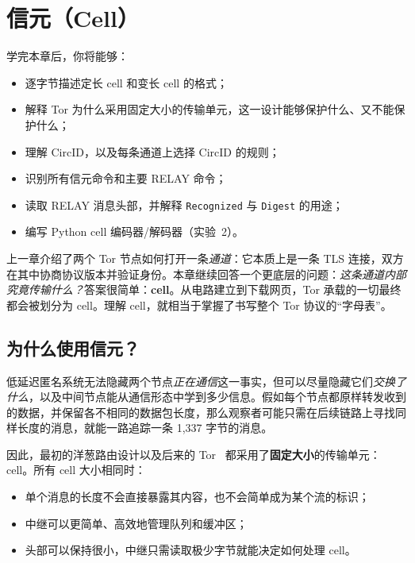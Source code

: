 \chapter{信元（Cell）}\label{cap:08-celle}

\begin{obiettivi}
学完本章后，你将能够：
\begin{itemize}[nosep]
  \item 逐字节描述定长 cell 和变长 cell 的格式；
  \item 解释 Tor 为什么采用固定大小的传输单元，这一设计能够保护什么、又不能保护什么；
  \item 理解 CircID，以及每条通道上选择 CircID 的规则；
  \item 识别所有信元命令和主要 RELAY 命令；
  \item 读取 RELAY 消息头部，并解释 \texttt{Recognized} 与 \texttt{Digest} 的用途；
  \item 编写 Python cell 编码器/解码器（实验~2）。
\end{itemize}
\end{obiettivi}

上一章介绍了两个 Tor 节点如何打开一条\emph{通道}：它本质上是一条 TLS 连接，双方在其中协商协议版本并验证身份。本章继续回答一个更底层的问题：\emph{这条通道内部究竟传输什么？}答案很简单：\textbf{cell}。从电路建立到下载网页，Tor 承载的一切最终都会被划分为 cell。理解 cell，就相当于掌握了书写整个 Tor 协议的“字母表”。

\section{为什么使用信元？}\label{sec:celle-perche}

低延迟匿名系统无法隐藏两个节点\emph{正在通信}这一事实，但可以尽量隐藏它们\emph{交换了什么}，以及中间节点能从通信形态中学到多少信息。假如每个节点都原样转发收到的数据，并保留各不相同的数据包长度，那么观察者可能只需在后续链路上寻找同样长度的消息，就能一路追踪一条 1,337 字节的消息。

因此，最初的洋葱路由设计以及后来的 Tor~\cite{dingledine2004tor} 都采用了\textbf{固定大小}的传输单元：cell。所有 cell 大小相同时：
\begin{itemize}
  \item 单个消息的长度不会直接暴露其内容，也不会简单成为某个流的标识；
  \item 中继可以更简单、高效地管理队列和缓冲区；
  \item 头部可以保持很小，中继只需读取极少字节就能决定如何处理 cell。
\end{itemize}

